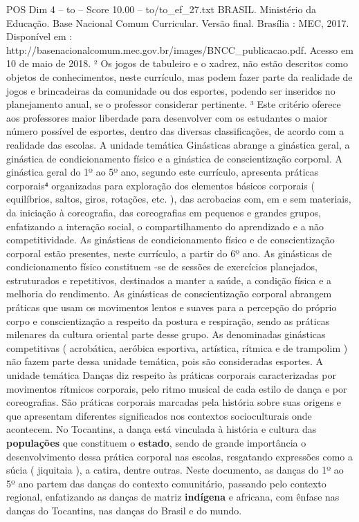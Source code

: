 \begin{textsample}{POS Dim 4 – to – Score 10.00 – to/to\_ef\_27.txt}
BRASIL.
Ministério da Educação.
Base Nacional Comum Curricular.
Versão final.
Brasília : MEC, 2017.
Disponível em : http://basenacionalcomum.mec.gov.br/images/BNCC\_publicacao.pdf.
Acesso em 10 de maio de 2018. ² Os jogos de tabuleiro e o xadrez, não estão descritos como objetos de conhecimentos, neste currículo, mas podem fazer parte da realidade de jogos e brincadeiras da comunidade ou dos esportes, podendo ser inseridos no planejamento anual, se o professor considerar pertinente. ³ Este critério oferece aos professores maior liberdade para desenvolver com os estudantes o maior número possível de esportes, dentro das diversas classificações, de acordo com a realidade das escolas.
A unidade temática Ginásticas abrange a ginástica geral, a ginástica de condicionamento físico e a ginástica de conscientização corporal.
A ginástica geral do 1º ao 5º ano, segundo este currículo, apresenta práticas corporais⁴ organizadas para exploração dos elementos básicos corporais ( equilíbrios, saltos, giros, rotações, etc. ), das acrobacias com, em e sem materiais, da iniciação à coreografia, das coreografias em pequenos e grandes grupos, enfatizando a interação social, o compartilhamento do aprendizado e a não competitividade.
As ginásticas de condicionamento físico e de conscientização corporal estão presentes, neste currículo, a partir do 6º ano.
As ginásticas de condicionamento físico constituem -se de sessões de exercícios planejados, estruturados e repetitivos, destinados a manter a saúde, a condição física e a melhoria do rendimento.
As ginásticas de conscientização corporal abrangem práticas que usam os movimentos lentos e suaves para a percepção do próprio corpo e conscientização a respeito da postura e respiração, sendo as práticas milenares da cultura oriental parte desse grupo.
As denominadas ginásticas competitivas ( acrobática, aeróbica esportiva, artística, rítmica e de trampolim ) não fazem parte dessa unidade temática, pois são consideradas esportes.
A unidade temática Danças diz respeito às práticas corporais caracterizadas por movimentos rítmicos corporais, pelo ritmo musical de cada estilo de dança e por coreografias.
São práticas corporais marcadas pela história sobre suas origens e que apresentam diferentes significados nos contextos socioculturais onde acontecem.
No Tocantins, a dança está vinculada à história e cultura das \textbf{populações} que constituem o \textbf{estado}, sendo de grande importância o desenvolvimento dessa prática corporal nas escolas, resgatando expressões como a súcia ( jiquitaia ), a catira, dentre outras.
Neste documento, as danças do 1º ao 5º ano partem das danças do contexto comunitário, passando pelo contexto regional, enfatizando as danças de matriz \textbf{indígena} e africana, com ênfase nas danças do Tocantins, nas danças do Brasil e do mundo.

\end{textsample}
